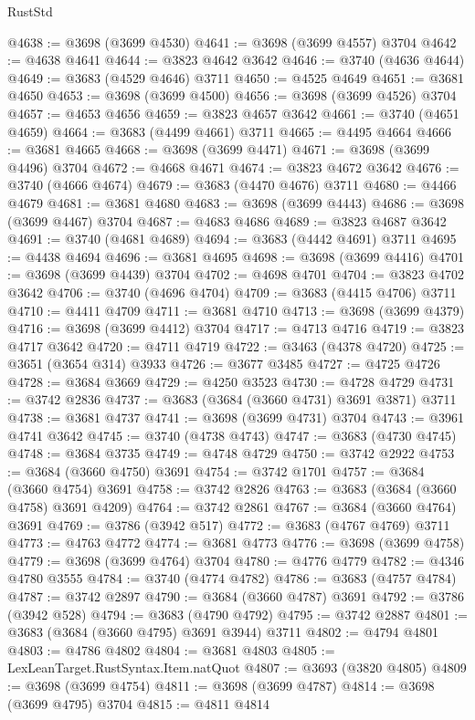 \begin{lexlean}{RustStd}
\begin{coremodule}
@4638 := @3698 (@3699 @4530)
@4641 := @3698 (@3699 @4557) @3704
@4642 := @4638 @4641
@4644 := @3823 @4642 @3642
@4646 := @3740 (@4636 @4644)
@4649 := @3683 (@4529 @4646) @3711
@4650 := @4525 @4649
@4651 := @3681 @4650
@4653 := @3698 (@3699 @4500)
@4656 := @3698 (@3699 @4526) @3704
@4657 := @4653 @4656
@4659 := @3823 @4657 @3642
@4661 := @3740 (@4651 @4659)
@4664 := @3683 (@4499 @4661) @3711
@4665 := @4495 @4664
@4666 := @3681 @4665
@4668 := @3698 (@3699 @4471)
@4671 := @3698 (@3699 @4496) @3704
@4672 := @4668 @4671
@4674 := @3823 @4672 @3642
@4676 := @3740 (@4666 @4674)
@4679 := @3683 (@4470 @4676) @3711
@4680 := @4466 @4679
@4681 := @3681 @4680
@4683 := @3698 (@3699 @4443)
@4686 := @3698 (@3699 @4467) @3704
@4687 := @4683 @4686
@4689 := @3823 @4687 @3642
@4691 := @3740 (@4681 @4689)
@4694 := @3683 (@4442 @4691) @3711
@4695 := @4438 @4694
@4696 := @3681 @4695
@4698 := @3698 (@3699 @4416)
@4701 := @3698 (@3699 @4439) @3704
@4702 := @4698 @4701
@4704 := @3823 @4702 @3642
@4706 := @3740 (@4696 @4704)
@4709 := @3683 (@4415 @4706) @3711
@4710 := @4411 @4709
@4711 := @3681 @4710
@4713 := @3698 (@3699 @4379)
@4716 := @3698 (@3699 @4412) @3704
@4717 := @4713 @4716
@4719 := @3823 @4717 @3642
@4720 := @4711 @4719
@4722 := @3463 (@4378 @4720)
@4725 := @3651 (@3654 @314) @3933
@4726 := @3677 @3485
@4727 := @4725 @4726
@4728 := @3684 @3669
@4729 := @4250 @3523
@4730 := @4728 @4729
@4731 := @3742 @2836
@4737 := @3683 (@3684 (@3660 @4731) @3691 @3871) @3711
@4738 := @3681 @4737
@4741 := @3698 (@3699 @4731) @3704
@4743 := @3961 @4741 @3642
@4745 := @3740 (@4738 @4743)
@4747 := @3683 (@4730 @4745)
@4748 := @3684 @3735
@4749 := @4748 @4729
@4750 := @3742 @2922
@4753 := @3684 (@3660 @4750) @3691
@4754 := @3742 @1701
@4757 := @3684 (@3660 @4754) @3691
@4758 := @3742 @2826
@4763 := @3683 (@3684 (@3660 @4758) @3691 @4209)
@4764 := @3742 @2861
@4767 := @3684 (@3660 @4764) @3691
@4769 := @3786 (@3942 @517)
@4772 := @3683 (@4767 @4769) @3711
@4773 := @4763 @4772
@4774 := @3681 @4773
@4776 := @3698 (@3699 @4758)
@4779 := @3698 (@3699 @4764) @3704
@4780 := @4776 @4779
@4782 := @4346 @4780 @3555
@4784 := @3740 (@4774 @4782)
@4786 := @3683 (@4757 @4784)
@4787 := @3742 @2897
@4790 := @3684 (@3660 @4787) @3691
@4792 := @3786 (@3942 @528)
@4794 := @3683 (@4790 @4792)
@4795 := @3742 @2887
@4801 := @3683 (@3684 (@3660 @4795) @3691 @3944) @3711
@4802 := @4794 @4801
@4803 := @4786 @4802
@4804 := @3681 @4803
@4805 := LexLeanTarget.RustSyntax.Item.natQuot
@4807 := @3693 (@3820 @4805)
@4809 := @3698 (@3699 @4754)
@4811 := @3698 (@3699 @4787)
@4814 := @3698 (@3699 @4795) @3704
@4815 := @4811 @4814

\end{coremodule}
\end{lexlean}
